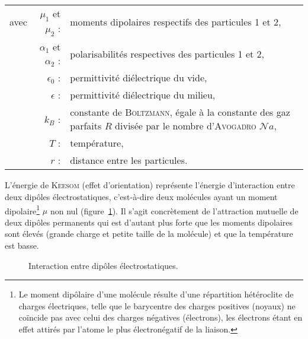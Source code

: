 \begin{flushleft}
\begin{tabular}{@{}lrp{10cm}}
avec & $\mu_{1}$ et $\mu_{2}$ : & moments dipolaires respectifs des particules 1 et 2, \\
& $\alpha_{1}$ et $\alpha_{2}$ : & polarisabilités respectives des particules 1 et 2, \\
& $\epsilon_{0}$ : & permittivité diélectrique du vide, \\
& $\epsilon$ : & permittivité diélectrique du milieu, \\
& $k_{B}$ : & constante de \textsc{Boltzmann}, égale à la constante des gaz parfaits $R$ divisée par le nombre d'\textsc{Avogadro} $\mathcal{N}\!a$, \\
& $T$ : & température, \\
& $r$ : & distance entre les particules. \\
\end{tabular}
\end{flushleft}

L'énergie de \textsc{Keesom} (effet d'orientation) représente l'énergie d'interaction entre deux dipôles électrostatiques, c'est-à-dire deux molécules ayant un moment dipolaire\footnote{Le moment dipôlaire d'une molécule résulte d'une répartition hétéroclite de charges électriques, telle que le barycentre des charges positives (noyaux) ne coïncide pas avec celui des charges négatives (électrons), les électrons étant en effet attirés par l'atome le plus électronégatif de la liaison.} $\mu{}$ non nul (figure~\ref{figKeesom}). Il s'agit concrètement de l'attraction mutuelle de deux dipôles permanents qui est d’autant plus forte que les moments dipolaires sont élevés (grande charge et petite taille de la molécule) et que la température est basse.

\begin{figure}[h]
\centering
{}
\caption{Interaction entre dipôles électrostatiques.}
\label{figKeesom}
\end{figure}

